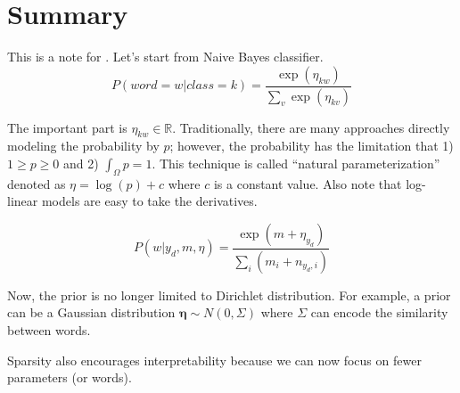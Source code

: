 \documentclass[11pt]{article}
\begin{document}
\section{Summary}

This is a note for \cite{eisenstein2011sparse}.
Let's start from Naive Bayes classifier.
$$
P(word = w|class = k) = \frac{\exp(\eta_{kw})}{\sum_v \exp(\eta_{kv})}
$$

The important part is $\eta_{kw} \in \mathbb{R}$. Traditionally, there are many approaches directly modeling the probability by $p$; however, the probability has the limitation that 1) $1 \geq p \geq 0$ and 2) $\int_{\Omega} p = 1$. This technique is called ``natural parameterization'' denoted as $\eta = \log(p) + c$ where $c$ is a constant value.
Also note that log-linear models are easy to take the derivatives.



$$
P(w|y_d, m, \eta) = \frac{\exp(m + \eta_{y_d})}{\sum_i (m_i + n_{y_d, i})}
$$

Now, the prior is no longer limited to Dirichlet distribution. For example, a prior can be a Gaussian distribution $\bm{\eta} \sim N(0, \Sigma)$ where $\Sigma$ can encode the similarity between words.

Sparsity also encourages interpretability because we can now focus on fewer parameters (or words).



\end{document}
